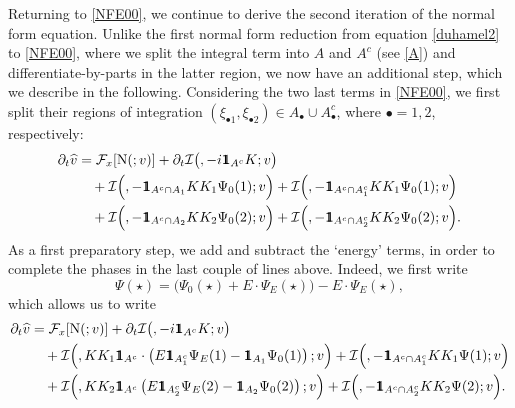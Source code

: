 \documentclass[a4paper,
11pt,  reqno]{amsart}
\makeatletter
\newcommand{\mathbbm}[1]{\mathchoice%
    {\hbox{\sffamily 1\kern-.40em 1}}%
    {\hbox{\sffamily 1\kern-.40em 1}}%
    {\hbox{\scriptsize\sffamily 1\kern-.30em 1}}%
    {\hbox{\tiny\sffamily 1\kern-.25em 1}}}%
\newcommand{\5}{\textup{V}}
\newcommand{\ft}{\widehat}
\newcommand{\ind}{\mathbbm 1}
\newcommand{\dt}{\partial_t}
\theoremstyle{remark}
\newcommand{\bul}{\bullet}
\newcommand{\Ft}{{\mathcal{F}}}
\def\<#1>{\csname MH@symb@#1\endcsname}
\newcommand{\Ical}{\mathcal{I}}
\numberwithin{equation}{section}
\numberwithin{theorem}{section}
\newcommand{\NN}{\mathrm{N}}
\makeatother
\begin{document}
Returning to \eqref{NFE00}, we continue to derive the second iteration of the normal form equation.
Unlike the first normal form reduction from equation \eqref{duhamel2} to \eqref{NFE00}, where we split the integral term into $A$ and $A^c$ (see \eqref{A}) and differentiate-by-parts in the latter region, we now have an additional step, which we describe in the following. Considering the two last terms in \eqref{NFE00}, we first split their regions of integration $(\xi_{\bul1}, \xi_{\bul2}) \in A_\bul \cup A_\bul^c$, where $\bul = 1,2$, respectively:
\begin{align}
\label{NFE001b}
\dt\ft v
&
= 
 \Ft_x[ \NN ( \<1>; v )]  
+ 
\dt \Ical \big( \<1>, -i  \ind_{A^c} K; v \big)
\\
&
\quad 
+
\Ical \Big( \<21>, - \ind_{A^c \cap A_1} KK_1\Psi_0(1) ; v  \Big)  
+
\Ical \Big( \<21>, - \ind_{A^c \cap A_1^c} KK_1\Psi_0(1) ; v  \Big) 
\\
&
\quad 
+
\Ical \Big( \<22>, - \ind_{A^c \cap A_2} KK_2\Psi_0(2) ; v  \Big) 
+
\Ical \Big( \<22>, - \ind_{A^c \cap A_2^c} KK_2\Psi_0(2) ; v  \Big) .
\end{align}
As a first preparatory step, we add and subtract the `energy' terms, in order to complete the phases in the last couple of lines above. Indeed, we first write 
\[
\Psi(\star) = \big( \Psi_0(\star) + E \cdot \Psi_E (\star) \big) - E \cdot \Psi_E(\star),
\]
which allows us to write 
\begin{align}
\label{NFE0011}
\dt\ft v
&
= 
 \Ft_x[ \NN ( \<1>; v )]  
+ 
\dt \Ical \big( \<1>, -i  \ind_{A^c} K; v \big)
\\
&
\quad 
+
\Ical \Big( \<21>, K K_1 \ind_{A^c} \cdot \left( E \ind_{A_1^c}  \Psi_E(1) - \ind_{A_1} \Psi_0(1) \right) ; v  \Big)  
+
\Ical \Big( \<21>, - \ind_{A^c \cap A_1^c} KK_1\Psi(1) ; v  \Big) 
\\
&
\quad 
+
\Ical \Big( \<22>, KK_2 \ind_{A^c} \left( E \ind_{A_2^c} \Psi_E(2) - \ind_{A_2} \Psi_0(2)\right) ; v  \Big) 
+
\Ical \Big( \<22>, - \ind_{A^c \cap A_2^c} KK_2\Psi(2) ; v  \Big). 
\end{align}
\end{document}
